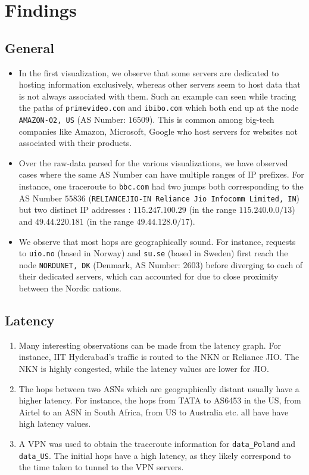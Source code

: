 \documentclass[a4paper, 11pt]{article}
\begin{document}
\section{Findings}
\subsection{General}
\begin{itemize}
  \item In the first visualization, we observe that some servers are dedicated to hosting information exclusively, whereas other servers seem to host data that is not always associated with them. Such an example can seen
while tracing the paths of \texttt{primevideo.com} and \texttt{ibibo.com} which both end up at the node \texttt{AMAZON-02, US} (AS Number: $16509$). This is common among big-tech companies like Amazon, Microsoft, Google 
who host servers for websites not associated with their products.
  \item Over the raw-data parsed for the various visualizations, we have observed cases where the same AS Number can have multiple ranges of IP prefixes. For instance, one traceroute to \texttt{bbc.com} had two jumps 
  both corresponding to the AS Number $55836$ (\texttt{RELIANCEJIO-IN Reliance Jio Infocomm Limited, IN}) but two distinct IP addresses : $115.247.100.29$ (in the range  $115.240.0.0/13$) and $49.44.220.181$ (in 
  the range $49.44.128.0/17$).
  \item We observe that most hops are geographically sound. For instance, requests to \texttt{uio.no} (based in Norway) and \texttt{su.se} (based in Sweden) first reach the node \texttt{NORDUNET, DK} 
  (Denmark, AS Number: $2603$) before diverging to each of their dedicated servers, which can accounted for due to close proximity between the Nordic nations.
\end{itemize}
\subsection{Latency}
\begin{enumerate}
    \item Many interesting observations can be made from the latency graph. For instance, IIT Hyderabad's traffic is routed to the NKN or Reliance JIO. The NKN is highly congested, while the latency values are lower for JIO.
    \item The hops between two ASNs which are geographically distant usually have a higher latency. For instance, the hops from TATA to AS6453 in the US, from Airtel to an ASN in South Africa, from US to Australia etc. all have have high
    latency values. 
    \item A VPN was used to obtain the traceroute information for \texttt{data\_Poland} and \texttt{data\_US}. The initial hops have a high latency, as they likely correspond to the time taken to tunnel to the VPN servers.
\end{enumerate}
\end{document}
